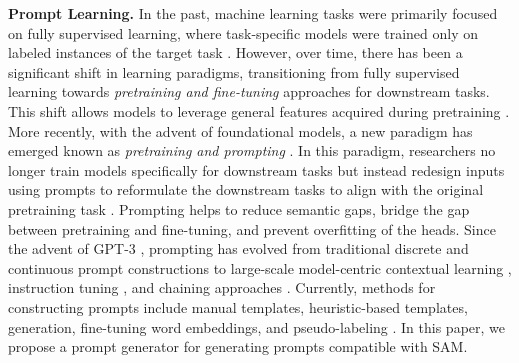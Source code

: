 \noindent\textbf{Prompt Learning.} In the past, machine learning tasks were primarily focused on fully supervised learning, where task-specific models were trained only on labeled instances of the target task  \cite{krizhevsky2017imagenet}. However, over time, there has been a significant shift in learning paradigms, transitioning from fully supervised learning towards \textit{pretraining and fine-tuning }approaches for downstream tasks. This shift allows models to leverage general features acquired during pretraining \cite{russakovsky2015imagenet, simonyan2014very, he2016deep}.
More recently, with the advent of foundational models, a new paradigm has emerged known as \textit{pretraining and prompting} \cite{chen2023ovarnet, lester2021power, liu2023pre, zhou2022learning}. In this paradigm, researchers no longer train models specifically for downstream tasks but instead redesign inputs using prompts to reformulate the downstream tasks to align with the original pretraining task \cite{radford2021learning, devlin2018bert, radford2019language}. Prompting helps to reduce semantic gaps, bridge the gap between pretraining and fine-tuning, and prevent overfitting of the heads. Since the advent of GPT-3 \cite{brown2020language}, prompting has evolved from traditional discrete \cite{liu2023pre} and continuous prompt constructions \cite{chen2023ovarnet, zhou2022learning} to large-scale model-centric contextual learning \cite{alayrac2022flamingo}, instruction tuning \cite{liu2024visual, peng2023instruction, gupta2022instructdial}, and chaining approaches \cite{wei2022chain, wang2022self, zhang2022automatic}.
Currently, methods for constructing prompts include manual templates, heuristic-based templates, generation, fine-tuning word embeddings, and pseudo-labeling \cite{liu2023pre, wang2022learning}. In this paper, we propose a prompt generator for generating prompts compatible with SAM.


